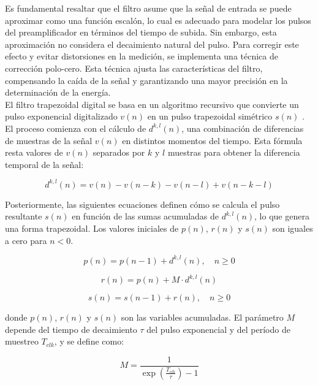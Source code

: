\documentclass{report}
\begin{document}
\noindent Es fundamental resaltar que el filtro asume que la señal de entrada se puede aproximar como una función escalón, lo cual es adecuado para modelar los pulsos del preamplificador en términos del tiempo de subida. Sin embargo, esta aproximación no considera el decaimiento natural del pulso. Para corregir este efecto y evitar distorsiones en la medición, se implementa una técnica de corrección polo-cero. Esta técnica ajusta las características del filtro, compensando la caída de la señal y garantizando una mayor precisión en la determinación de la energía.\\

\noindent El filtro trapezoidal digital se basa en un algoritmo recursivo que convierte un pulso exponencial digitalizado \( v(n) \) en un pulso trapezoidal simétrico \( s(n) \) \cite{jordanov1994digital}. El proceso comienza con el cálculo de \( d^{k,l}(n) \), una combinación de diferencias de muestras de la señal \( v(n) \) en distintos momentos del tiempo. Esta fórmula resta valores de \( v(n) \) separados por \( k \) y \( l \) muestras para obtener la diferencia temporal de la señal:

\begin{equation}
d^{k,l}(n) = v(n) - v(n-k) - v(n-l) + v(n-k-l)
\end{equation}

\noindent Posteriormente, las siguientes ecuaciones definen cómo se calcula el pulso resultante \( s(n) \) en función de las sumas acumuladas de \( d^{k,l}(n) \), lo que genera una forma trapezoidal. Los valores iniciales de \( p(n) \), \( r(n) \) y \( s(n) \) son iguales a cero para \( n < 0 \).

\begin{equation}
p(n) = p(n-1) + d^{k,l}(n), \quad n \geq 0
\end{equation}

\begin{equation}
r(n) = p(n) + M \cdot d^{k,l}(n)
\end{equation}

\begin{equation}
s(n) = s(n-1) + r(n), \quad n \geq 0
\end{equation}

\noindent donde \( p(n) \), \( r(n) \) y \( s(n) \) son las variables acumuladas. El parámetro \( M \) depende del tiempo de decaimiento \( \tau \) del pulso exponencial y del período de muestreo \( T_{clk} \), y se define como:

\begin{equation}
M = \frac{1}{\exp\left(\frac{T_{clk}}{\tau}\right) - 1}
\end{equation}
\end{document}
